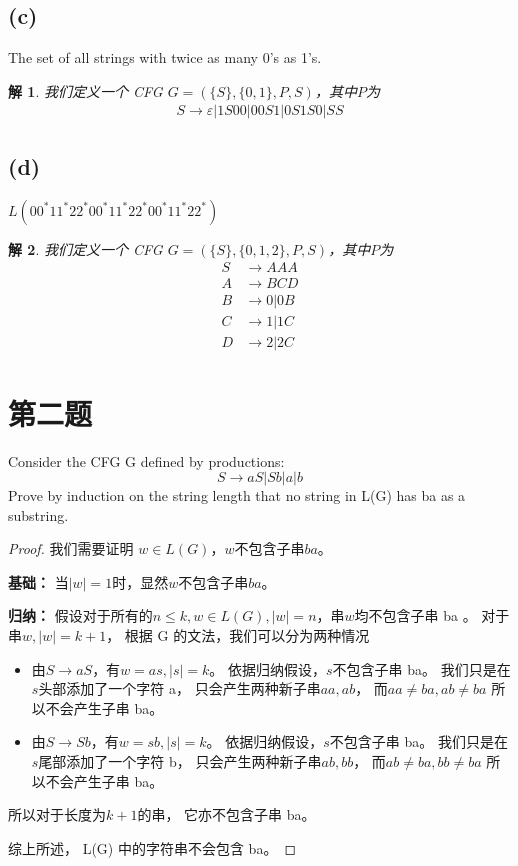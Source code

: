 \documentclass[12pt,onecolumn]{article}
\newtheorem*{proof}{证明}
\theoremstyle{plain}
\newtheorem{solution}{解}[section]
\begin{document}
\subsection{(c)}
The set of all strings with twice as many 0's as 1's.
\begin{solution}
 我们定义一个 CFG $G = (\{S\}, \{0, 1\}, P, S)$，其中$P$为
 \begin{align*}
 S \to \varepsilon | 1S00 | 00S1 | 0S1S0 | SS
 \end{align*}
\end{solution}

\subsection{(d)}
$L(00^*11^*22^*00^*11^*22^*00^*11^*22^*)$
\begin{solution}
 我们定义一个 CFG $G = (\{S\}, \{0, 1, 2\}, P, S)$，其中$P$为
 \begin{align*}
 S & \to AAA    \\
 A & \to BCD    \\
 B & \to 0 | 0B \\
 C & \to 1 | 1C \\
 D & \to 2 | 2C
 \end{align*}
\end{solution}

\section{第二题}
Consider the CFG G defined by productions:
\[ S \to aS | Sb | a | b \]
Prove by induction on the string length
that no string in L(G) has ba as a substring.
\begin{proof}
 我们需要证明 $w \in L(G)$，$w$不包含子串$ba$。

 \textbf{基础：}
 当$|w| = 1$时，显然$w$不包含子串$ba$。

 \textbf{归纳：}
 假设对于所有的$n \le k, w \in L(G), |w| = n$，串$w$均不包含子串 ba 。
 对于串$w, |w| = k + 1$，
 根据 G 的文法，我们可以分为两种情况
 \begin{itemize}
 \item
 由$S \to aS$，有$w = as, |s| = k$。
 依据归纳假设，$s$不包含子串 ba。
 我们只是在$s$头部添加了一个字符 a，
 只会产生两种新子串$aa, ab$，
 而$aa \neq ba, ab \neq ba$
 所以不会产生子串 ba。
 \item
 由$S \to Sb$，有$w = sb, |s| = k$。
 依据归纳假设，$s$不包含子串 ba。
 我们只是在$s$尾部添加了一个字符 b，
 只会产生两种新子串$ab, bb$，
 而$ab \neq ba, bb \neq ba$
 所以不会产生子串 ba。
 \end{itemize}
 所以对于长度为$k + 1$的串，
 它亦不包含子串 ba。

 综上所述，
 L(G) 中的字符串不会包含 ba。
\end{proof}
\end{document}
